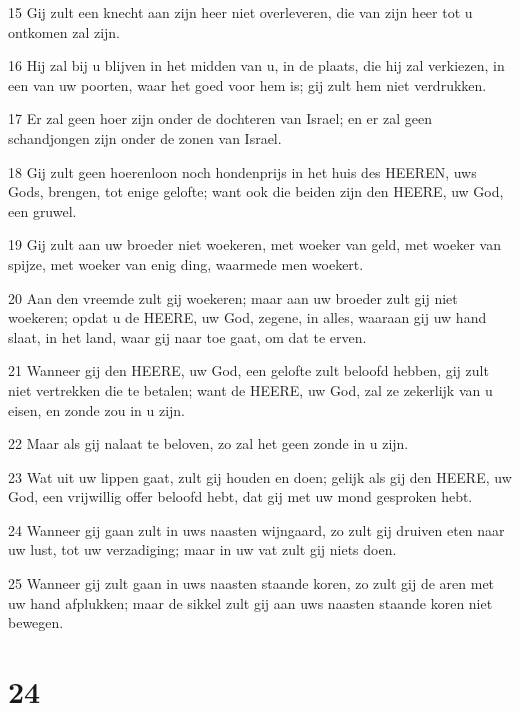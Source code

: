 \par 15 Gij zult een knecht aan zijn heer niet overleveren, die van zijn heer tot u ontkomen zal zijn.
\par 16 Hij zal bij u blijven in het midden van u, in de plaats, die hij zal verkiezen, in een van uw poorten, waar het goed voor hem is; gij zult hem niet verdrukken.
\par 17 Er zal geen hoer zijn onder de dochteren van Israel; en er zal geen schandjongen zijn onder de zonen van Israel.
\par 18 Gij zult geen hoerenloon noch hondenprijs in het huis des HEEREN, uws Gods, brengen, tot enige gelofte; want ook die beiden zijn den HEERE, uw God, een gruwel.
\par 19 Gij zult aan uw broeder niet woekeren, met woeker van geld, met woeker van spijze, met woeker van enig ding, waarmede men woekert.
\par 20 Aan den vreemde zult gij woekeren; maar aan uw broeder zult gij niet woekeren; opdat u de HEERE, uw God, zegene, in alles, waaraan gij uw hand slaat, in het land, waar gij naar toe gaat, om dat te erven.
\par 21 Wanneer gij den HEERE, uw God, een gelofte zult beloofd hebben, gij zult niet vertrekken die te betalen; want de HEERE, uw God, zal ze zekerlijk van u eisen, en zonde zou in u zijn.
\par 22 Maar als gij nalaat te beloven, zo zal het geen zonde in u zijn.
\par 23 Wat uit uw lippen gaat, zult gij houden en doen; gelijk als gij den HEERE, uw God, een vrijwillig offer beloofd hebt, dat gij met uw mond gesproken hebt.
\par 24 Wanneer gij gaan zult in uws naasten wijngaard, zo zult gij druiven eten naar uw lust, tot uw verzadiging; maar in uw vat zult gij niets doen.
\par 25 Wanneer gij zult gaan in uws naasten staande koren, zo zult gij de aren met uw hand afplukken; maar de sikkel zult gij aan uws naasten staande koren niet bewegen.

\chapter{24}

